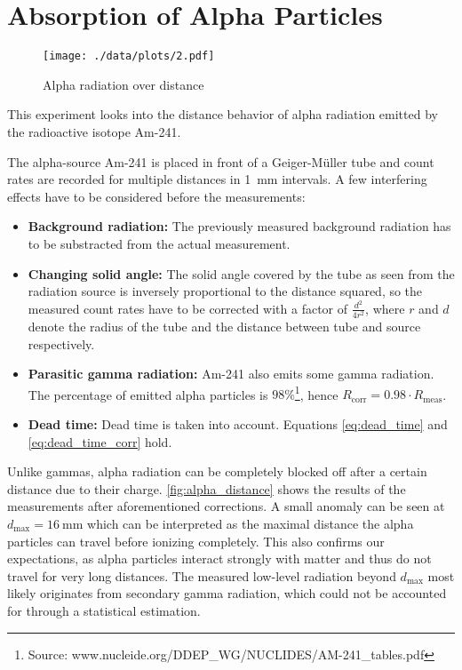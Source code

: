 \chapter{Absorption of Alpha Particles}
\begin{figure}[ht!]
	\centering
	\texttt{[image: ./data/plots/2.pdf]}
	\caption[Alpha radiation over distance]{Alpha radiation over distance}
	\label{fig:alpha_distance}
\end{figure}

This experiment looks into the distance behavior of alpha radiation emitted by the radioactive isotope Am-241.

The alpha-source Am-241 is placed in front of a Geiger-Müller tube and count rates are recorded for multiple distances in \SI{1}{\milli\meter} intervals.
A few interfering effects have to be considered before the measurements:
\begin{itemize}
	\item \textbf{Background radiation:} The previously measured background radiation has to be substracted from the actual measurement.
	\item \textbf{Changing solid angle:} The solid angle covered by the tube as seen from the radiation source is inversely proportional to the distance squared, so the measured count rates have to be corrected with a factor of $\frac{d^2}{4r^2}$, where $r$ and $d$ denote the radius of the tube and the distance between tube and source respectively.
	\item \textbf{Parasitic gamma radiation:} Am-241 also emits some gamma radiation. The percentage of emitted alpha particles is $\num{98}\%$\footnote{Source: www.nucleide.org/DDEP\_WG/NUCLIDES/AM-241\_tables.pdf}, hence $R_\text{corr}=0.98\cdot R_\text{meas}$.
	\item \textbf{Dead time:} Dead time is taken into account. Equations \ref{eq:dead_time} and \ref{eq:dead_time_corr} hold.
\end{itemize}

Unlike gammas, alpha radiation can be completely blocked off after a certain distance due to their charge.
\autoref{fig:alpha_distance} shows the results of the measurements after aforementioned corrections.
A small anomaly can be seen at $d_\text{max}=\SI{16}{\milli\meter}$ which can be interpreted as the maximal distance the alpha particles can travel before ionizing completely.
This also confirms our expectations, as alpha particles interact strongly with matter and thus do not travel for very long distances.
The measured low-level radiation beyond $d_\text{max}$ most likely originates from secondary gamma radiation, which could not be accounted for through a statistical estimation.

